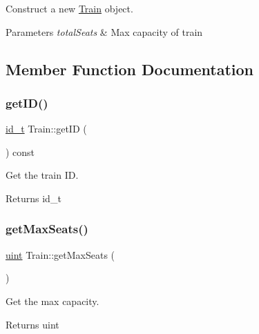 Construct a new \mbox{\hyperlink{classTrain}{Train}} object. 


\begin{DoxyParams}{Parameters}
{\em total\+Seats} & Max capacity of train \\
\hline
\end{DoxyParams}


\subsection{Member Function Documentation}
\mbox{\label{classTrain_a7310ae0bc5b43ea392e4fa62630ee56b}} 
\subsubsection{\texorpdfstring{get\+I\+D()}{getID()}}
{\footnotesize\ttfamily \mbox{\hyperlink{project__utils_8h_a8f3a969054ad2200720b96e7e23dd4e1}{id\+\_\+t}} Train\+::get\+ID (\begin{DoxyParamCaption}{ }\end{DoxyParamCaption}) const}



Get the train ID. 

\begin{DoxyReturn}{Returns}
id\+\_\+t 
\end{DoxyReturn}
\mbox{\label{classTrain_a93cd372664bac4ba28fa36e40316444a}} 
\subsubsection{\texorpdfstring{get\+Max\+Seats()}{getMaxSeats()}}
{\footnotesize\ttfamily \mbox{\hyperlink{project__utils_8h_a91ad9478d81a7aaf2593e8d9c3d06a14}{uint}} Train\+::get\+Max\+Seats (\begin{DoxyParamCaption}{ }\end{DoxyParamCaption})}



Get the max capacity. 

\begin{DoxyReturn}{Returns}
uint 
\end{DoxyReturn}
\mbox{\label{classTrain_a2f8a45aaa96058a2675422d206221964}} 
